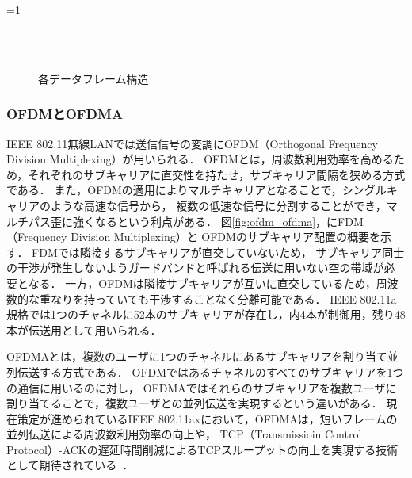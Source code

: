\documentclass[master]{kuisthesis}		%
\newcounter{flagFig}
\begin{document}
			\ifnum\value{flagFig}=1 {\begin{figure}[t]
				\begin{center}
					\\
					\\
					\caption{各データフレーム構造}
					\label{fig:frame}
				\end{center}
			\end{figure}}\fi

		\subsubsection{OFDMとOFDMA}
			IEEE 802.11無線LANでは送信信号の変調にOFDM（Orthogonal Frequency Division Multiplexing）が用いられる．
			OFDMとは，周波数利用効率を高めるため，それぞれのサブキャリアに直交性を持たせ，サブキャリア間隔を狭める方式である．
			また，OFDMの適用によりマルチキャリアとなることで，シングルキャリアのような高速な信号から，
			複数の低速な信号に分割することができ，マルチパス歪に強くなるという利点がある．
			図\ref{fig:ofdm_ofdma}，にFDM（Frequency Division Multiplexing）と
			OFDMのサブキャリア配置の概要を示す．
			FDMでは隣接するサブキャリアが直交していないため，
			サブキャリア同士の干渉が発生しないようガードバンドと呼ばれる伝送に用いない空の帯域が必要となる．
			一方，OFDMは隣接サブキャリアが互いに直交しているため，周波数的な重なりを持っていても干渉することなく分離可能である．
			IEEE 802.11a規格では1つのチャネルに52本のサブキャリアが存在し，内4本が制御用，残り48本が伝送用として用いられる．
			\par
			OFDMAとは，複数のユーザに1つのチャネルにあるサブキャリアを割り当て並列伝送する方式である．
			OFDMではあるチャネルのすべてのサブキャリアを1つの通信に用いるのに対し，
			OFDMAではそれらのサブキャリアを複数ユーザに割り当てることで，複数ユーザとの並列伝送を実現するという違いがある．
			現在策定が進められているIEEE 802.11axにおいて，OFDMAは，短いフレームの並列伝送による周波数利用効率の向上や，
			TCP（Transmissioin Control Protocol）-ACKの遅延時間削減によるTCPスループットの向上を実現する技術として期待されている~\cite{ofdma}．
\end{document}
